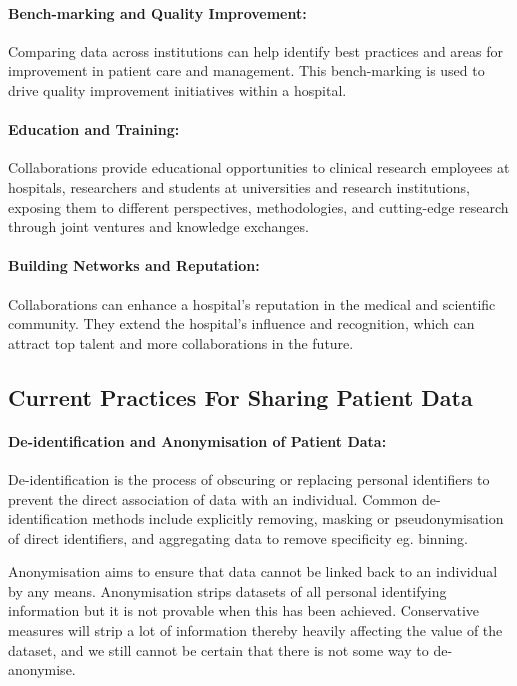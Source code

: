 \documentclass[11pt]{article}
\begin{document}
\paragraph{Bench-marking and Quality Improvement:} Comparing data across institutions can help identify best practices and areas for improvement in patient care and management. This bench-marking is used to drive quality improvement initiatives within a hospital\cite{Werner2005}.

\paragraph{Education and Training:} Collaborations provide educational opportunities to clinical research employees at hospitals, researchers and students at universities and research institutions, exposing them to different perspectives, methodologies, and cutting-edge research through joint ventures and knowledge exchanges.

\paragraph{Building Networks and Reputation:} Collaborations can enhance a hospital’s reputation in the medical and scientific community\cite{Vasan2021}. They extend the hospital’s influence and recognition, which can attract top talent and more collaborations in the future.

\subsection{Current Practices For Sharing Patient Data}

\paragraph{De-identification and Anonymisation of Patient Data:}
De-identification is the process of obscuring or replacing personal identifiers to prevent the direct association of data with an individual. Common de-identification methods include explicitly removing,  masking or pseudonymisation of direct identifiers, and  aggregating data to remove specificity eg. binning.  

Anonymisation aims to ensure that data cannot be linked back to an individual by any means. Anonymisation strips datasets of all personal identifying information but it is not provable when this has been achieved. Conservative measures will strip a lot of information thereby heavily affecting the value of the dataset, and we still cannot be certain that there is not some way to de-anonymise. 
\end{document}
